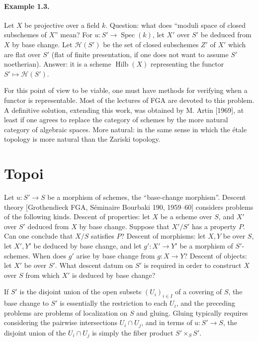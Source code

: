 \documentclass[11pt]{article}
\begin{document}
\paragraph{Example 1.3.}
Let \(X\) be projective over a field \(k\). Question: what does ``moduli space of closed subschemes of \(X\)'' mean? For \(u:S'\to\operatorname{Spec}(k)\), let \(X'\) over \(S'\) be deduced from \(X\) by base change. Let \(\mathcal H(S')\) be the set of closed subschemes \(Z'\) of \(X'\) which are flat over \(S'\) (flat of finite presentation, if one does not want to assume \(S'\) noetherian). Answer: it is a scheme \(\operatorname{Hilb}(X)\) representing the functor \(S'\mapsto\mathcal H(S')\).

For this point of view to be viable, one must have methods for verifying when a functor is representable. Most of the lectures of FGA are devoted to this problem. A definitive solution, extending this work, was obtained by M. Artin [1969], at least if one agrees to replace the category of schemes by the more natural category of algebraic spaces. More natural: in the same sense in which the étale topology is more natural than the Zariski topology.

\section{Topoi}

Let \(u:S'\to S\) be a morphism of schemes, the ``base-change morphism''. Descent theory [Grothendieck FGA, Séminaire Bourbaki 190, 1959--60] considers problems of the following kinds. Descent of properties: let \(X\) be a scheme over \(S\), and \(X'\) over \(S'\) deduced from \(X\) by base change. Suppose that \(X'/S'\) has a property \(P\). Can one conclude that \(X/S\) satisfies \(P\)? Descent of morphisms: let \(X,Y\) be over \(S\), let \(X',Y'\) be deduced by base change, and let \(g':X'\to Y'\) be a morphism of \(S'\)-schemes. When does \(g'\) arise by base change from \(g:X\to Y\)? Descent of objects: let \(X'\) be over \(S'\). What descent datum on \(S'\) is required in order to construct \(X\) over \(S\) from which \(X'\) is deduced by base change?

If \(S'\) is the disjoint union of the open subsets \((U_i)_{i\in I}\) of a covering of \(S\), the base change to \(S'\) is essentially the restriction to each \(U_i\), and the preceding problems are problems of localization on \(S\) and gluing. Gluing typically requires considering the pairwise intersections \(U_i\cap U_j\), and in terms of \(u:S'\to S\), the disjoint union of the \(U_i\cap U_j\) is simply the fiber product \(S'\times_S S'\).
\end{document}
